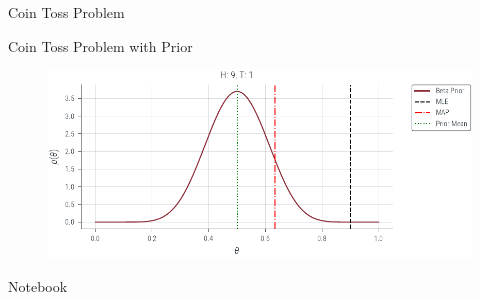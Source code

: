 \documentclass{beamer}
\begin{document}
\begin{section}{Coin Toss Problem}
    \begin{frame}{Coin Toss Problem with Prior}
        \begin{figure}
            \centerline{\includegraphics[scale = 0.75]{../figures/map/coin_toss_prior_mle_map.pdf}}
        \end{figure}

    Notebook
    \end{frame}
\end{section}




\end{document}
